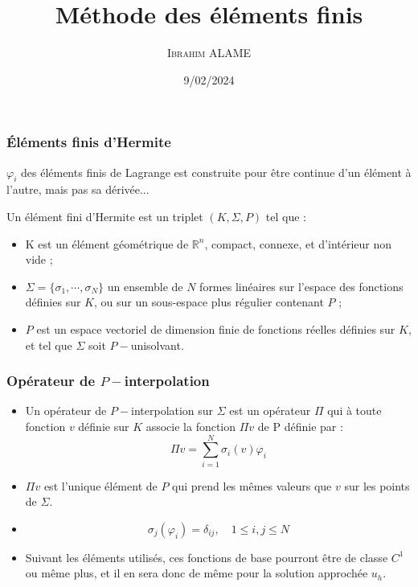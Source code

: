 \documentclass{beamer}
\title{Méthode des éléments finis}
\author{ \textsc{Ibrahim ALAME}}\institute{ESTP}
\date{9/02/2024}
\begin{document}
 \begin{frame}
  \titlepage
  \end{frame}
  
\begin{frame}
\frametitle{Éléments finis d'Hermite}
$\varphi_i$ des éléments finis de Lagrange est construite pour être continue d'un élément à l'autre, mais pas sa dérivée... 

Un élément fini d'Hermite est un triplet $(K,\Sigma,P)$ tel que :
\begin{itemize}
\item K est un élément géométrique de $\mathbb{R}^n$, compact, connexe, et d'intérieur non vide ;
\item $\Sigma=\{\sigma_1,\cdots,\sigma_N\}$ un ensemble de $N$ formes linéaires sur l'espace des fonctions définies sur $K$, ou sur un sous-espace plus régulier contenant $P$ ;
\item $P$ est un espace vectoriel de dimension finie de fonctions réelles définies sur $K$, et tel que $\Sigma$ soit $P-$unisolvant.
\end{itemize}
\end{frame}
\begin{frame}
\frametitle{Opérateur de $P-$interpolation }


\begin{itemize}
\item Un opérateur de $P-$interpolation sur $\Sigma$ est un opérateur $\Pi$ qui à toute fonction $v$ définie sur $K$ associe la fonction $\Pi v$ de P définie par :
\[\Pi v=\sum_{i=1}^N\sigma_i(v)\varphi_i\]
\item $\Pi v$  est l'unique élément de $P$ qui prend les mêmes valeurs que $v$ sur les points de $\Sigma$.
\item
\[\sigma_j(\varphi_i)=\delta_{ij},\quad 1\leq i,j \leq N\]
\item Suivant les éléments utilisés, ces fonctions de base pourront être de classe $C^1$ ou même plus, et il en sera donc de même pour la solution approchée $u_h$.
\end{itemize}

\end{frame}
\end{document}

